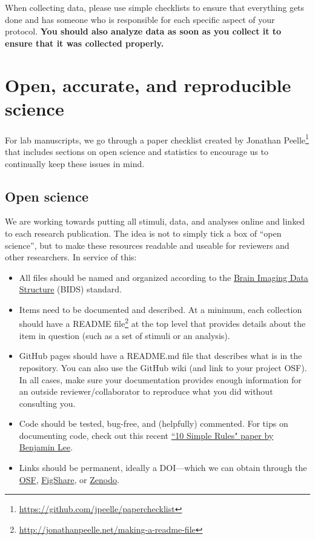 \documentclass[letterpaper,12pt,oneside]{memoir}
\begin{document}
When collecting data, please use simple checklists to ensure that everything gets done and has someone who is responsible for each specific aspect of your protocol. \textbf{You should also analyze data as soon as you collect it to ensure that it was collected properly.}


\section{Open, accurate, and reproducible science}
\label{sec:openscience}

For lab manuscripts, we go through a paper checklist created by Jonathan Peelle\footnote{\url{https://github.com/jpeelle/paperchecklist}} that includes sections on open science and statistics to encourage us to continually keep these issues in mind.


\subsection{Open science}

We are working towards putting all stimuli, data, and analyses online and linked to each research publication. The idea is not to simply tick a box of ``open science'', but to make these resources readable and useable for reviewers and other researchers. In service of this:

\begin{itemize}
\item All files should be named and organized according to the \href{https://bids.neuroimaging.io/}{Brain Imaging Data Structure} (BIDS) standard.
\item Items need to be documented and described. At a minimum, each collection should have a README file\footnote{\url{http://jonathanpeelle.net/making-a-readme-file}} at the top level that provides details about the item in question (such as a set of stimuli or an analysis).
\item GitHub pages should have a README.md file that describes what is in the repository. You can also use the GitHub wiki (and link to your project OSF). In all cases, make sure your documentation provides enough information for an outside reviewer/collaborator to reproduce what you did without consulting you.
\item Code should be tested, bug-free, and (helpfully) commented. For tips on documenting code, check out this recent \href{https://journals.plos.org/ploscompbiol/article?id=10.1371/journal.pcbi.1006561}{``10 Simple Rules" paper by Benjamin Lee}.
\item Links should be permanent, ideally a DOI---which we can obtain through the \href{http://help.osf.io/m/sharing/l/524208-create-dois-and-arks}{OSF}, \href{https://figshare.com/}{FigShare}, or \href{https://zenodo.org/}{Zenodo}.
\end{itemize}
\end{document}
